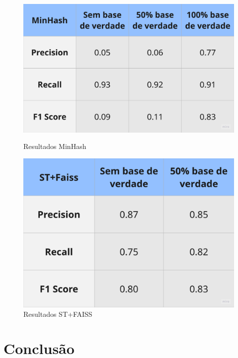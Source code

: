 \documentclass[a4paper,12pt]{article}
\begin{document}
\begin{figure}[h!]
    \centering
    \begin{minipage}{0.45\textwidth}  %
        \centering
        \includegraphics[width=\textwidth]{images/tableMinHash.png}
        \caption{Resultados MinHash}
    \end{minipage}
    \hfill
    \begin{minipage}{0.39\textwidth}
        \centering
        \includegraphics[width=\textwidth]{images/tableFaiss.png}
        \caption{Resultados ST+FAISS}
    \end{minipage}
\end{figure}

\newpage %
\section{Conclusão}
\end{document}
